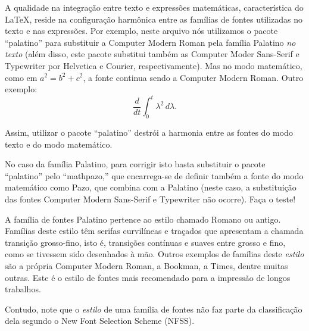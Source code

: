 \documentclass{article}
\begin{document}
	A qualidade na integração entre texto e expressões matemáticas, característica do \LaTeX, reside na configuração harmônica entre as famílias de fontes utilizadas no texto e nas expressões. Por exemplo, neste arquivo nós utilizamos o pacote ``palatino'' para substituir a Computer Modern Roman pela família Palatino \emph{no texto} (além disso, este pacote substitui também as Computer Moder Sans-Serif e Typewriter por Helvetica e Courier, respectivamente). Mas no modo matemático, como em $a^2 = b^2 + c^2$, a fonte continua sendo a Computer Modern Roman. Outro exemplo:		
	\[ %
	\frac{d}{dt}\int_0^t \lambda^2\, d\lambda.
	\] %

	Assim, utilizar o pacote ``palatino'' destrói a harmonia entre as fontes do modo texto e do modo matemático.
	
	No caso da família Palatino, para corrigir isto basta substituir o pacote ``palatino'' pelo ``mathpazo,'' que encarrega-se de definir também a fonte do modo matemático como Pazo, que combina com a Palatino (neste caso, a substituição das fontes Computer Modern Sans-Serif e Typewriter não ocorre). Faça o teste!
	
	A família de fontes Palatino pertence ao estilo chamado Romano ou antigo. Famílias deste estilo têm serifas curvilíneas e traçados que apresentam a chamada transição grosso-fino, isto é, transições contínuas e suaves entre grosso e fino, como se tivessem sido desenhados à mão. Outros exemplos de famílias deste \emph{estilo} são a própria Computer Modern Roman, a Bookman, a Times, dentre muitas outras. Este é o estilo de fontes mais recomendado para a impressão de longos trabalhos.
	
	Contudo, note que o \emph{estilo} de uma família de fontes não faz parte da classificação dela segundo o New Font Selection Scheme (NFSS).
\end{document}

